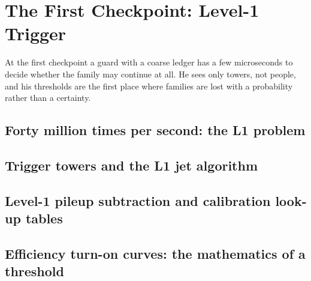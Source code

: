 \chapter{The First Checkpoint: Level-1 Trigger}
\label{ch:first_checkpoint}

\begin{journeybox}
At the first checkpoint a guard with a coarse ledger has a few microseconds to
decide whether the family may continue at all. He sees only towers, not people,
and his thresholds are the first place where families are lost with a
probability rather than a certainty.
\end{journeybox}


\section{Forty million times per second: the L1 problem}
\label{sec:first_checkpoint:forty_million_times_per_second_the_l1_pr}

\section{Trigger towers and the L1 jet algorithm}
\label{sec:first_checkpoint:trigger_towers_and_the_l1_jet_algorithm}

\section{Level-1 pileup subtraction and calibration look-up tables}
\label{sec:first_checkpoint:level_1_pileup_subtraction_and_calibrati}

\section{Efficiency turn-on curves: the mathematics of a threshold}
\label{sec:first_checkpoint:efficiency_turn_on_curves_the_mathematic}

